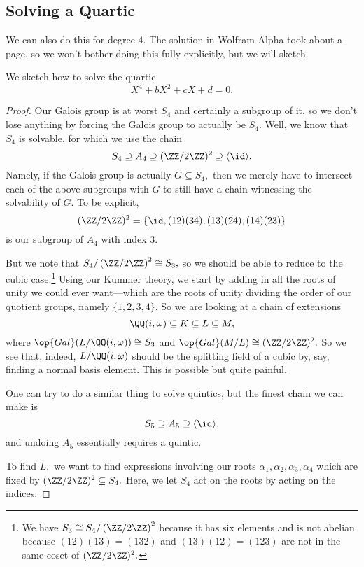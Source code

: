 \documentclass[../notes.tex]{subfiles}
\begin{document}
\subsection{Solving a Quartic}
We can also do this for degree-$4.$ The solution in Wolfram Alpha took about a page, so we won't bother doing this fully explicitly, but we will sketch.
\begin{exe}
	We sketch how to solve the quartic
	\[X^4+bX^2+cX+d=0.\]
\end{exe}
\begin{proof}
	Our Galois group is at worst $S_4$ and certainly a subgroup of it, so we don't lose anything by forcing the Galois group to actually be $S_4.$ Well, we know that $S_4$ is solvable, for which we use the chain
	\[S_4\supseteq A_4\supseteq(\ZZ/2\ZZ)^2\supseteq\langle\id\rangle.\]
	Namely, if the Galois group is actually $G\subseteq S_4,$ then we merely have to intersect each of the above subgroups with $G$ to still have a chain witnessing the solvability of $G.$ To be explicit,
	\[(\ZZ/2\ZZ)^2=\{\id,(12)(34),(13)(24),(14)(23)\}\]
	is our subgroup of $A_4$ with index $3.$

	But we note that $S_4/\left(\ZZ/2\ZZ\right)^2\cong S_3,$ so we should be able to reduce to the cubic case.\footnote{We have $S_3\cong S_4/\left(\ZZ/2\ZZ\right)^2$ because it has six elements and is not abelian because $(12)(13)=(132)$ and $(13)(12)=(123)$ are not in the same coset of $(\ZZ/2\ZZ)^2.$} Using our Kummer theory, we start by adding in all the roots of unity we could ever want---which are the roots of unity dividing the order of our quotient groups, namely $\{1,2,3,4\}.$ So we are looking at a chain of extensions
	\[\QQ(i,\omega)\subseteq K\subseteq L\subseteq M,\]
	where $\op{Gal}(L/\QQ(i,\omega))\cong S_3$ and $\op{Gal}(M/L)\cong(\ZZ/2\ZZ)^2.$ So we see that, indeed, $L/\QQ(i,\omega)$ should be the splitting field of a cubic by, say, finding a normal basis element. This is possible but quite painful.
	\begin{remark}
		One can try to do a similar thing to solve quintics, but the finest chain we can make is
		\[S_5\supseteq A_5\supseteq\langle\id\rangle,\]
		and undoing $A_5$ essentially requires a quintic.
	\end{remark}
	To find $L,$ we want to find expressions involving our roots $\alpha_1,\alpha_2,\alpha_3,\alpha_4$ which are fixed by $(\ZZ/2\ZZ)^2\subseteq S_4.$ Here, we let $S_4$ act on the roots by acting on the indices.
	

\end{proof}
\end{document}
